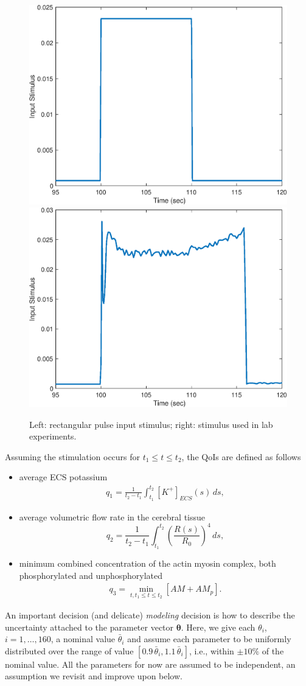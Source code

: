 \begin{figure}[h]
\centering
\includegraphics[width=.4 \textwidth]{Figures/Rectangular_Stimulus.eps}
\includegraphics[width=.4 \textwidth]{Figures/Experimental_Stimulus.eps}
\caption{Left: rectangular pulse input stimulus; right: stimulus used in lab experiments.}
\label{input_stimuli}
\end{figure}

 Assuming the stimulation occurs for $t_1\le t \le t_2$, the QoIs are defined as follows
 \begin{itemize}
\item average ECS potassium 
\begin{eqnarray}
 q_1 = \frac{1}{t_2-t_1}\int_{t_1}^{t_2}[K^+]_{ECS}(s)\, ds, \label{K_ECS_Mean}
\end{eqnarray}
\item average volumetric flow rate in the cerebral tissue
\begin{equation}
 q_2 = \frac{1}{t_2-t_1}\int_{t_1}^{t_2}\left(\frac{R(s)}{R_0}\right)^4\, ds, \label{vol_flow}
\end{equation}
 \item minimum combined concentration of the actin myosin complex, both phosphorylated and unphosphorylated
\begin{eqnarray}
q_3 = \min _{t, t_1\le t \le t_2} [AM+AM_p]. \label{AM_AMp_Min}
\end{eqnarray}
\end{itemize}

An important decision (and delicate) {\sl modeling} decision  is how to describe the uncertainty attached to the parameter vector $\boldsymbol{\theta}$. Here, we give each $\theta_i$, $i=1,\dots, 160$, a nominal value $\bar \theta_i$ and assume each parameter to be uniformly distributed over the range of value $[0.9\, \bar\theta_i, 1.1 \,\bar\theta_i]$, i.e., within $\pm 10\%$ of the nominal value. All the parameters for now are assumed to be independent, an assumption we revisit and improve upon below. 

